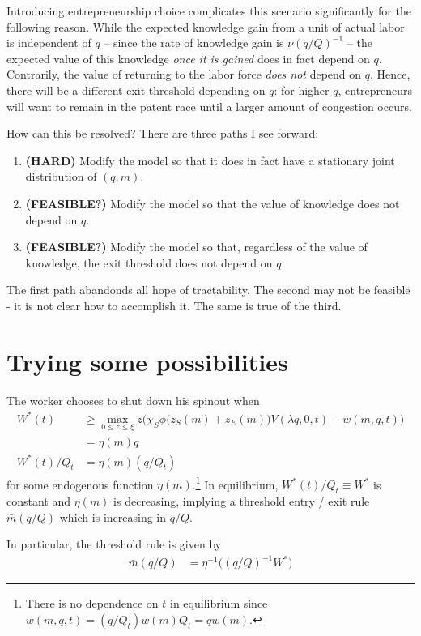 \documentclass[11pt,english]{article}
\theoremstyle{remark}
\begin{document}
Introducing entrepreneurship choice complicates this scenario significantly for the following reason. While the expected knowledge gain from a unit of actual labor is independent of $q$ -- since the rate of knowledge gain is $\nu (q / Q)^{-1}$ -- the expected value of this knowledge \textit{once it is gained} does in fact depend on $q$. Contrarily, the value of returning to the labor force \textit{does not} depend on $q$. Hence, there will be a different exit threshold depending on $q$: for higher $q$, entrepreneurs will want to remain in the patent race until a larger amount of congestion occurs.

How can this be resolved? There are three paths I see forward:

\begin{enumerate}
	\item \textbf{(HARD)} Modify the model so that it does in fact have a stationary joint distribution of $(q,m)$.
	\item \textbf{(FEASIBLE?)} Modify the model so that the value of knowledge does not depend on $q$.
	\item \textbf{(FEASIBLE?)} Modify the model so that, regardless of the value of knowledge, the exit threshold does not depend on $q$. 
\end{enumerate}

The first path abandonds all hope of tractability. The second may not be feasible - it is not clear how to accomplish it. The same is true of the third.

\section{Trying some possibilities}

The worker chooses to shut down his spinout when 
\begin{align*}
	W^*(t) &\ge \max_{0 \le z \le \xi} z \Big(\chi_S  \phi \big( z_S(m) + z_E(m)\big) V(\lambda q,0,t) - w(m,q,t) \Big) \\
	       &= \eta(m) q \\
	W^*(t) / Q_t &= \eta(m) (q / Q_t)
\end{align*}
for some endogenous function $\eta(m)$.\footnote{There is no dependence on $t$ in equilibrium since $w(m,q,t) = (q/Q_t) w(m) Q_t = qw(m)$.} In equilibrium, $W^*(t) / Q_t \equiv W^*$ is constant and $\eta(m)$ is decreasing, implying a threshold entry / exit rule $\bar{m}(q/Q)$ which is increasing in $q/Q$. 

In particular, the threshold rule is given by 
\begin{align*}
	\bar{m}(q/Q) &= \eta^{-1} \big( (q/Q)^{-1} W^* \big) 
\end{align*}
\end{document}
